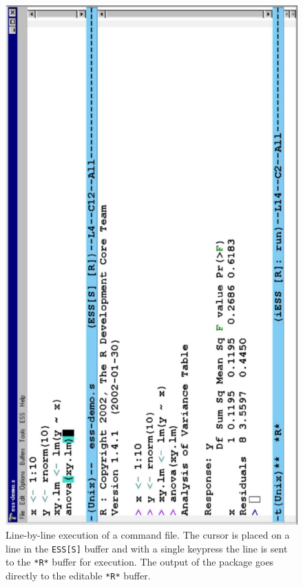 \documentclass{article}
\newif\ifdraft
\newcommand{\stexttt}[1]{{\small\texttt{#1}}}
\newcommand{\emptyfig}{
\hspace*{42pt}\rule{324pt}{.25pt}\\
\hspace*{42pt}\rule{.25pt}{10pc}
\rule{316pt}{.25pt}
\rule{.25pt}{10pc}}
\begin{document}
\begin{figure}[tbp]
  \centering
  \ifdraft
     \emptyfig
  \else
     \includegraphics[angle=270,width=\textwidth]{ess-demo}
  \fi
  \caption{Line-by-line execution of a command file.
The cursor is placed on a line in
the \stexttt{ESS[S]} buffer and with a single keypress the line is
sent to the \stexttt{*R*} buffer for execution.  The output of the
package goes directly to the editable \stexttt{*R*} buffer.}
  \label{f.ess-demo}
\end{figure}
\end{document}
